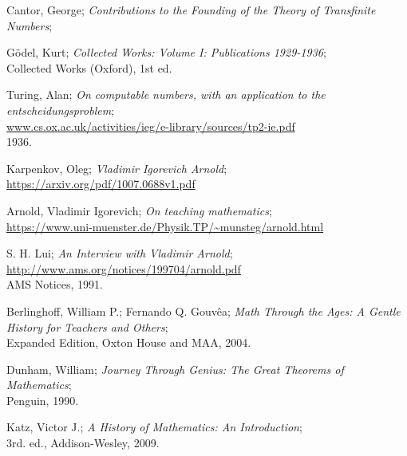 \documentclass[a4paper,11pt]{article}
\begin{document}
\begin{thebibliography}{99}



\bibitem{}
Cantor, George; \emph{Contributions to the Founding of the Theory of Transfinite Numbers};

\bibitem{}
Gödel, Kurt; \emph{Collected Works: Volume I: Publications 1929-1936};\\
Collected Works (Oxford), 1st ed.

\bibitem{}
Turing, Alan; \emph{On computable numbers, with an application to the entscheidungsproblem};\\
\url{www.cs.ox.ac.uk/activities/ieg/e-library/sources/tp2-ie.pdf}\\
1936.

\bibitem{}
Karpenkov, Oleg; \emph{Vladimir Igorevich Arnold};\\
\url{https://arxiv.org/pdf/1007.0688v1.pdf}

\bibitem{}
Arnold, Vladimir Igorevich; \emph{On teaching mathematics};\\
\url{https://www.uni-muenster.de/Physik.TP/~munsteg/arnold.html}

\bibitem{}
S. H. Lui; \emph{An Interview with Vladimir Arnold};\\
\url{http://www.ams.org/notices/199704/arnold.pdf}\\
AMS Notices, 1991.

\bibitem{}
Berlinghoff, William P.; Fernando Q. Gouvêa; \emph{Math Through the Ages: A Gentle History for Teachers and Others};\\
Expanded Edition, Oxton House and MAA, 2004. 

\bibitem{}
Dunham, William; \emph{Journey Through Genius: The Great Theorems of Mathematics};\\
Penguin, 1990. 

\bibitem{}
Katz, Victor J.; \emph{A History of Mathematics: An Introduction};\\
3rd. ed., Addison-Wesley, 2009.


\end{thebibliography}
\end{document}
